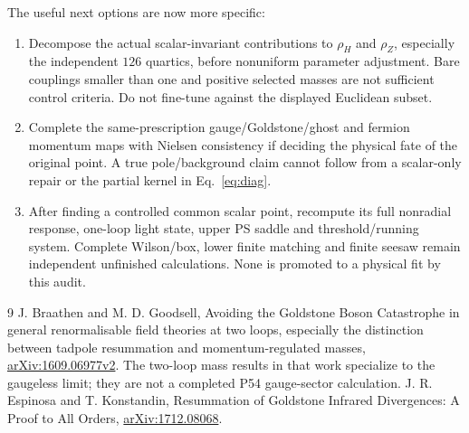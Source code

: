 \documentclass[11pt]{article}
\begin{document}
The useful next options are now more specific:
\begin{enumerate}
\item Decompose the actual scalar-invariant contributions to
$\rho_H$ and $\rho_Z$, especially the independent $126$ quartics,
before nonuniform parameter adjustment. Bare couplings smaller than
one and positive selected masses are not sufficient control criteria.
Do not fine-tune against the displayed Euclidean subset.
\item Complete the same-prescription gauge/Goldstone/ghost and fermion
momentum maps with Nielsen consistency if deciding the physical fate
of the original point. A true pole/background claim cannot follow
from a scalar-only repair or the partial kernel in Eq.~\eqref{eq:diag}.
\item After finding a controlled common scalar point, recompute its
full nonradial response, one-loop light state, upper PS saddle and
threshold/running system. Complete Wilson/box, lower finite matching
and finite seesaw remain independent unfinished calculations. None
is promoted to a physical fit by this audit.
\end{enumerate}

\begin{thebibliography}{9}
 J. Braathen and M. D. Goodsell,
Avoiding the Goldstone Boson Catastrophe in general renormalisable field
theories at two loops, especially the distinction between tadpole
resummation and momentum-regulated masses,
\href{https://arxiv.org/html/1609.06977v2}{arXiv:1609.06977v2}.
The two-loop mass results in that work specialize to the gaugeless limit;
they are not a completed P54 gauge-sector calculation.
 J. R. Espinosa and T. Konstandin,
Resummation of Goldstone Infrared Divergences: A Proof to All Orders,
\href{https://arxiv.org/abs/1712.08068}{arXiv:1712.08068}.
\end{thebibliography}
\end{document}

